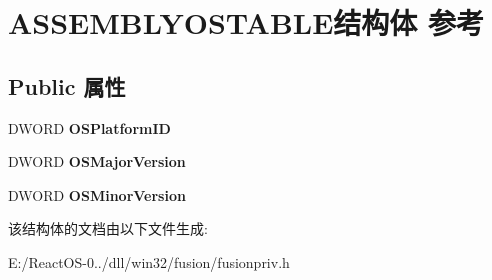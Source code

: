 \hypertarget{struct_a_s_s_e_m_b_l_y_o_s_t_a_b_l_e}{}\section{A\+S\+S\+E\+M\+B\+L\+Y\+O\+S\+T\+A\+B\+L\+E结构体 参考}
\label{struct_a_s_s_e_m_b_l_y_o_s_t_a_b_l_e}
\subsection*{Public 属性}
\begin{DoxyCompactItemize}
\item 
\mbox{\label{struct_a_s_s_e_m_b_l_y_o_s_t_a_b_l_e_a60f5c44433ea2eaf08a43fcacea88dd8}} 
D\+W\+O\+RD {\bfseries O\+S\+Platform\+ID}
\item 
\mbox{\label{struct_a_s_s_e_m_b_l_y_o_s_t_a_b_l_e_a3cb86ef9f972cff7adef72eb2415b39d}} 
D\+W\+O\+RD {\bfseries O\+S\+Major\+Version}
\item 
\mbox{\label{struct_a_s_s_e_m_b_l_y_o_s_t_a_b_l_e_ad17e73bbf174d4d6665da78e9d33b625}} 
D\+W\+O\+RD {\bfseries O\+S\+Minor\+Version}
\end{DoxyCompactItemize}


该结构体的文档由以下文件生成\+:\begin{DoxyCompactItemize}
\item 
E\+:/\+React\+O\+S-\/0../dll/win32/fusion/fusionpriv.\+h\end{DoxyCompactItemize}
